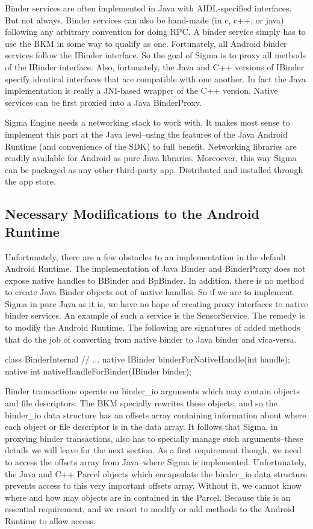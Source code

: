 \documentclass[prodmode]{acmlarge}
\begin{document}
Binder services are often implemented in Java with AIDL-specified interfaces. But not always. Binder services can also be hand-made (in c, c++, or java) following any arbitrary convention for doing RPC. A binder service simply has to use the BKM in some way to qualify as one. Fortunately, all Android binder services follow the IBinder interface. So the goal of Sigma is to proxy all methods of the IBinder interface. Also, fortunately, the Java and C++ versions of IBinder specify identical interfaces that are compatible with one another. In fact the Java implementation is really a JNI-based wrapper of the C++ version. Native services can be first proxied into a Java BinderProxy.

Sigma Engine needs a networking stack to work with. It makes most sense to implement this part at the Java level--using the features of the Java Android Runtime (and convenience of the SDK) to full benefit. Networking libraries are readily available for Android as pure Java libraries. Moreoever, this way Sigma can be packaged as any other third-party app. Distributed and installed through the app store.

\subsection{Necessary Modifications to the Android Runtime}
\label{sec:AndroidRuntimeModifications}
Unfortunately, there are a few obstacles to an implementation in the default Android Runtime. The implementation of Java Binder and BinderProxy does not expose native handles to BBinder and BpBinder. In addition, there is no method to create Java Binder objects out of native handles. So if we are to implement Sigma in pure Java as it is, we have no hope of creating proxy interfaces to native binder services. An example of such a service is the SensorService. The remedy is to modify the Android Runtime. The following are signatures of added methods that do the job of converting from native binder to Java binder and vica-versa.

\begin{snippet}
class BinderInternal {
  // ...
  native IBinder binderForNativeHandle(int handle);
  native int nativeHandleForBinder(IBinder binder);
}
\end{snippet}

Binder transactions operate on binder\_io arguments which may contain objects and file descriptors. The BKM specially rewrites these objects, and so the binder\_io data structure has an offsets array containing information about where each object or file descriptor is in the data array. It follows that Sigma, in proxying binder transactions, also has to specially manage such arguments--these details we will leave for the next section. As a first requirement though, we need to access the offsets array from Java--where Sigma is implemented. Unfortunately, the Java and C++ Parcel objects which encapsulate the binder\_io data structure prevents access to this very important offsets array. Without it, we cannot know where and how may objects are in contained in the Parcel. Because this is an essential requirement, and we resort to modify or add methods to the Android Runtime to allow access.
\end{document}
